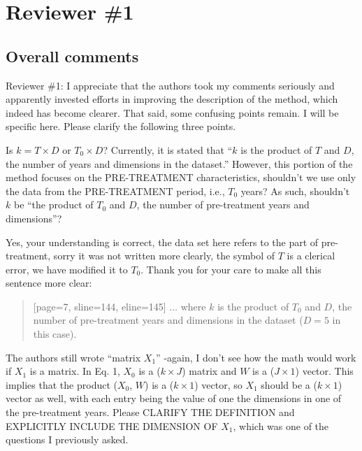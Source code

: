 \section{Reviewer \#1}\label{reviewer_1}

\subsection*{Overall comments}

Reviewer \#1: I appreciate that the authors took my comments seriously and apparently invested efforts in improving the description of the method, which indeed has become clearer. That said, some confusing points remain. I will be specific here. Please clarify the following three points.

\RC{} Is $k = T \times D$ or $T_0 \times D$? Currently, it is stated that ``$k$ is the product of $T$ and $D$, the number of years and dimensions in the dataset.'' However, this portion of the method focuses on the PRE-TREATMENT characteristics, shouldn't we use only the data from the PRE-TREATMENT period, i.e., $T_0$ years? As such, shouldn't $k$ be ``the product of $T_0$ and $D$, the number of pre-treatment years and dimensions''?

\AR{} Yes, your understanding is correct, the data set here refers to the part of pre-treatment, sorry it was not written more clearly, the symbol of $T$ is a clerical error, we have modified it to $T_0$. Thank you for your care to make all this sentence more clear:

\begin{quote}[page=7, sline=144, eline=145]
    $\dots$ where $k$ is the product of $T_0$ and $D$, the number of pre-treatment years and dimensions in the dataset ($D = 5$ in this case).
\end{quote}

\RC{} The authors still wrote ``matrix $X_1$'' -again, I don't see how the math would work if $X_1$ is a matrix. In Eq. 1, $X_0$ is a ($k \times J$) matrix and $W$ is a ($J \times 1$) vector. This implies that the product ($X_0$, $W$) is a ($k \times 1$) vector, so $X_1$ should be a ($k \times 1$) vector as well, with each entry being the value of one the dimensions in one of the pre-treatment years. Please CLARIFY THE DEFINITION and EXPLICITLY INCLUDE THE DIMENSION OF $X_1$, which was one of the questions I previously asked.

